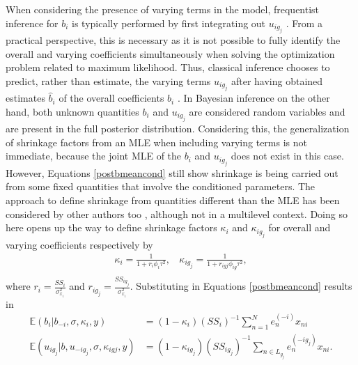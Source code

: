 When considering the presence of varying terms in the model, frequentist inference for $b_i$ is typically performed by first integrating out $u_{ig_j}$ \citep{lme4}. From a practical perspective, this is necessary as it is not possible to fully identify the overall and varying coefficients simultaneously when solving the optimization problem related to maximum likelihood. Thus, classical inference chooses to predict, rather than estimate,  the varying terms $u_{ig_j}$ after having obtained estimates $\hat{b}_i$ of the overall coefficients $b_i$ \citep{lme4,wakefield2013bayesian}. In Bayesian inference on the other hand, both unknown quantities $b_i$ and $u_{ig_j}$ are considered random variables and are present in the full posterior distribution. Considering this, the generalization of shrinkage factors from an MLE when including varying terms is not immediate, because the joint MLE of the $b_i$ and $u_{ig_j}$ does not exist in this case. However, Equations \eqref{postbmeancond} still show shrinkage is being carried out from some fixed quantities that involve the conditioned parameters. The approach to define shrinkage from quantities different than the MLE has been considered by other authors too \citep{BaiHypothesisNB,PolsonHalfCauchy}, although not in a multilevel context. Doing so here opens up the way to define shrinkage factors $\kappa_i$ and $\kappa_{ig_j}$ for overall and varying coefficients respectively by
\begin{equation}
    \label{def:kappa}
\begin{aligned}
\kappa_i= \frac{ 1 }{1 + r_i \phi_i\tau^2  }, \ \ \ \
\kappa_{ig_j}= \frac{ 1 }{1+r_{igj}\phi_{ig}\tau^2 },\\
\end{aligned}
\end{equation}
where $r_i=\frac{ SS_i}{ \sigma^2_{x_i}}$ and $r_{ig_j} = \frac{ SS_{ig_j}}{ \sigma^2_{x_i} }$. Substituting in Equations \eqref{postbmeancond}  results in
\begin{equation}
    \label{postcoeffmeankappa}
    \begin{aligned}
    \mathbb{E}(b_i| b_{-i}, \sigma, \kappa_i, y ) &= (1-\kappa_i)  (SS_i)^{-1} \sum_{n=1}^N e_{n}^{(-i)} x_{ni} \\
      \mathbb{E}(u_{ig_j}| b, u_{-ig_j} ,\sigma, \kappa_{igj}, y ) &=  (1-\kappa_{ig_j})   (SS_{ig_j})^{-1}   \sum_{n \in L_{g_j}}  e_{n}^{(-ig_j)} x_{ni}. \\
    \end{aligned}
\end{equation}
